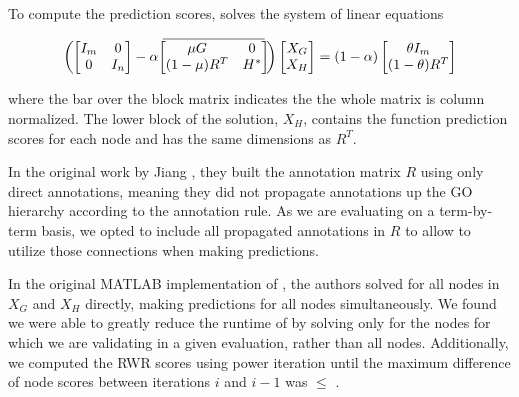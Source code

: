 To compute the prediction scores, \birgrank solves the system of linear equations
\newcommand{\overbar}[1]{\mkern 5.5mu\overline{\mkern-5.5mu#1\mkern-5.5mu}\mkern 5.5mu}

\begin{equation}
\bigg( \hspace{-2pt}
\begin{bmatrix} I_m & 0 \\ 0   & I_n \end{bmatrix} - \alpha 
\overbar{ \begin{bmatrix} \mu G & 0 \\ (1-\mu)R^T & H^* \end{bmatrix} }
\hspace{-2pt} \bigg)
\begin{bmatrix} X_G \\ X_H \end{bmatrix}
 = (1-\alpha)
 \begin{bmatrix} \theta I_m \\ (1-\theta)R^T \end{bmatrix}
\end{equation}

where the bar over the block matrix indicates the the whole matrix is column normalized. 
The lower block of the solution, $X_H$, contains the function prediction scores for each node and has the same dimensions as $R^T$.


In the original work by Jiang \etal, they built the annotation matrix $R$ using only direct annotations, meaning they did not propagate annotations up the GO hierarchy according to the annotation rule. As we are evaluating on a term-by-term basis, we opted to include all propagated annotations in $R$ to allow \birgrank to utilize those connections when making predictions.

In the original MATLAB implementation of \birgrank, the authors solved for all nodes in $X_G$ and $X_H$ directly, making predictions for all nodes simultaneously. 
We found we were able to greatly reduce the runtime of \birgrank by solving only for the nodes for which we are validating in a given evaluation, rather than all nodes. Additionally, we computed the RWR scores using power iteration until the maximum difference of node scores between iterations $i$ and $i-1$ was $\leq$ . 




